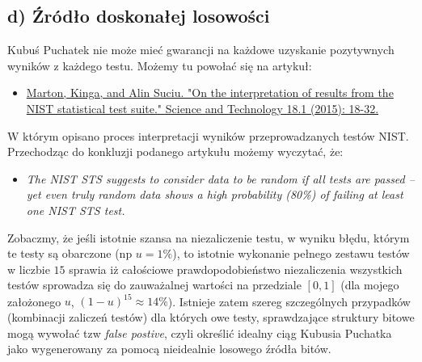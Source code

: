 \documentclass{article}
\begin{document}
\subsection{d) Źródło doskonałej losowości}

Kubuś Puchatek nie może mieć gwarancji na każdowe uzyskanie pozytywnych wyników z każdego testu. Możemy tu powołać się na artykuł:

\begin{itemize}
    \item \href{http://romjist.ro/content/pdf/02-msys.pdf}{Marton, Kinga, and Alin Suciu. "On the interpretation of results from the NIST statistical test suite." Science and Technology 18.1 (2015): 18-32.}
\end{itemize}

W którym opisano proces interpretacji wyników przeprowadzanych testów NIST. Przechodząc do konkluzji podanego artykułu możemy wyczytać, że:

\begin{itemize}
    \item \textit{The NIST STS suggests to consider data to be random if all tests are
passed – yet even truly random data shows a high probability (80\%) of failing at least
one NIST STS test.}
\end{itemize}

\noindent
Zobaczmy, że jeśli istotnie szansa na niezaliczenie testu, w wyniku błędu, którym te testy są obarczone (np $u=1\%$), to istotnie wykonanie pełnego zestawu testów w liczbie $15$ sprawia iż całościowe prawdopodobieństwo niezaliczenia wszystkich testów sprowadza się do zauważalnej wartości na przedziale $[0,1]$ (dla mojego założonego $u$, $(1-u)^{15}\approx 14\%$). Istnieje zatem szereg szczególnych przypadków (kombinacji zaliczeń testów) dla których owe testy, sprawdzające struktury bitowe mogą wywołać tzw \textit{false postive}, czyli określić idealny ciąg Kubusia Puchatka jako wygenerowany za pomocą nieidealnie losowego źródła bitów.
\end{document}
